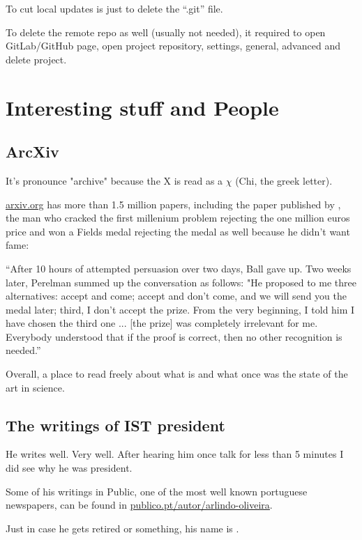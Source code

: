 To cut local updates is just to delete the ``.git'' file.

To delete the remote repo as well (usually not needed), it required to open GitLab/GitHub page, open project repository, settings, general, advanced and delete project.



\section{Interesting stuff and People}

\subsection{ArcXiv}
\par It's pronounce "archive" because the X is read as a $\chi$ (Chi, the greek letter).
\par \href{https://arxiv.org/}{\ul{arxiv.org}} has more than 1.5 million papers, including the paper published by , the man who cracked the first millenium problem rejecting the one million euros price and won a Fields medal rejecting the medal as well because he didn't want fame: 

\begin{center}
    ``After 10 hours of attempted persuasion over two days, Ball gave up. Two weeks later, Perelman summed up the conversation as follows: "He proposed to me three alternatives: accept and come; accept and don't come, and we will send you the medal later; third, I don't accept the prize. From the very beginning, I told him I have chosen the third one ... [the prize] was completely irrelevant for me. Everybody understood that if the proof is correct, then no other recognition is needed.''
\end{center}
\par Overall, a place to read freely about what is and what once was the state of the art in science.

\subsection{The writings of IST president}
\par He writes well. Very well. After hearing him once talk for less than 5 minutes I did see why he was president.
\par Some of his writings in Public, one of the most well known portuguese newspapers, can be found in \href{https://www.publico.pt/autor/arlindo-oliveira}{\ul{publico.pt/autor/arlindo-oliveira}}.
\par Just in case he gets retired or something, his name is .



